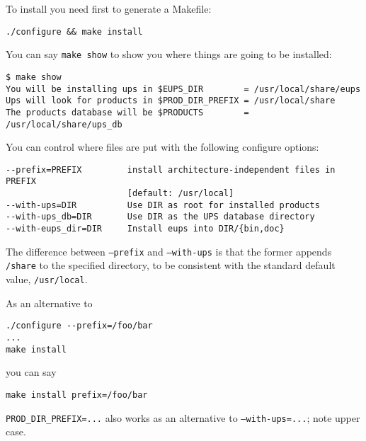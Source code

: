 \documentclass{article}
\begin{document}
  To install you need first to generate a Makefile:
\begin{verbatim}
./configure && make install
\end{verbatim}

You can say \texttt{make show} to show you where things are
going to be installed:
\begin{verbatim}
$ make show
You will be installing ups in $EUPS_DIR        = /usr/local/share/eups
Ups will look for products in $PROD_DIR_PREFIX = /usr/local/share
The products database will be $PRODUCTS        = /usr/local/share/ups_db
\end{verbatim}

You can control where files are put with the following configure options:
\begin{verbatim}
--prefix=PREFIX         install architecture-independent files in PREFIX
                        [default: /usr/local]
--with-ups=DIR          Use DIR as root for installed products
--with-ups_db=DIR       Use DIR as the UPS database directory
--with-eups_dir=DIR     Install eups into DIR/{bin,doc}
\end{verbatim}
The difference between \texttt{--prefix} and \texttt{--with-ups}
is that the former appends \texttt{/share} to the specified directory, to
be consistent with the standard default value, \texttt{/usr/local}.
  
As an alternative to
\begin{verbatim}
./configure --prefix=/foo/bar
...
make install
\end{verbatim}
you can say
\begin{verbatim}
make install prefix=/foo/bar
\end{verbatim}
\texttt{PROD\_DIR\_PREFIX=...} also works as an alternative to \texttt{--with-ups=...};
note upper case.
\end{document}
